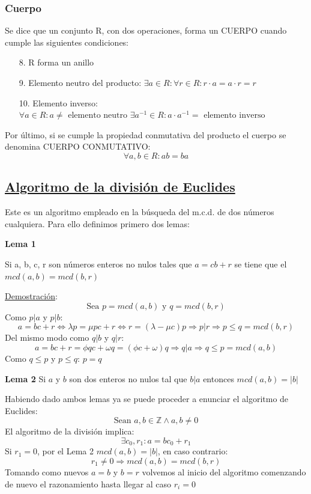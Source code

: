 \documentclass[10pt,a4paper,openright]{book}
\begin{document}
\subsubsection*{Cuerpo}
Se dice que un conjunto R, con dos operaciones, forma un CUERPO cuando cumple las siguientes condiciones:
\begin{enumerate}
\item [8.]R forma un anillo
\item [9.]Elemento neutro del producto: $\exists a\in R : \forall r\in R :r\cdot a=a\cdot r=r$
\item [10.]Elemento inverso: $\forall a \in R : a\neq \mbox{ elemento neutro }\exists a^{-1}\in R : a\cdot a^{-1}=\mbox{ elemento inverso}$
\end{enumerate}
Por último, si se cumple la propiedad conmutativa del producto el cuerpo se denomina CUERPO CONMUTATIVO:
$$\forall a,b \in R : ab=ba$$

\subsection*{\underline{Algoritmo de la división de Euclides}}
Este es un algoritmo empleado en la búsqueda del m.c.d. de dos números cualquiera. Para ello definimos primero dos lemas:\par
\textbf{Lema 1}\par
Si a, b, c, r son números enteros no nulos tales que $a=cb+r$ se tiene que el $mcd(a,b)=mcd(b,r)$\par
\underline{Demostración}:
$$\mbox{Sea }p=mcd(a,b)\mbox{ y }q=mcd(b,r)$$
Como $p|a$ y $p|b$:
$$a=bc+r\Leftrightarrow \lambda p= \mu pc +r \Leftrightarrow r=(\lambda-\mu c)p\Rightarrow p|r \Rightarrow p\leq q=mcd(b,r)$$
Del mismo modo como $q|b$ y $q|r$:
$$a=bc+r=\phi qc + \omega q= (\phi c + \omega)q \Rightarrow q|a \Rightarrow q\leq p=mcd(a,b)$$
Como $q\leq p$ y $p\leq q$: $p=q$\par
\vspace{0.5cm}
\textbf{Lema 2}
Si $a$ y $b$ son dos enteros no nulos tal que $b|a$ entonces $mcd(a,b)=|b|$\par
\vspace{0.5cm}
Habiendo dado ambos lemas ya se puede proceder a enunciar el algoritmo de Euclides:
$$\mbox{Sean }a,b\in \mathbb Z \wedge a,b\neq 0$$
El algoritmo de la división implica:
$$\exists c_0, r_1 : a=bc_0+r_1$$
Si $r_1=0$, por el Lema 2 $mcd(a,b)=|b|$, en caso contrario:
$$r_1\neq 0\Rightarrow mcd(a,b)=mcd(b,r)$$
Tomando como nuevos $a=b$ y $b=r$ volvemos al inicio del algoritmo comenzando de nuevo el razonamiento hasta llegar al caso $r_i=0$
\end{document}
